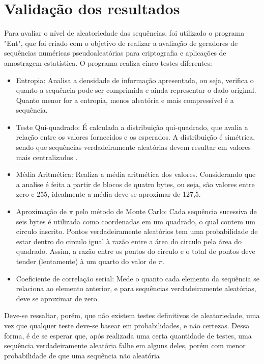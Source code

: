 \section{Validação dos resultados}
Para avaliar o nível de aleatoriedade das sequências, foi utilizado o programa "Ent", que foi criado com o objetivo de realizar a avaliação de geradores de sequências numéricas pseudoaleatórias para criptografia e aplicações de amostragem estatística. O programa realiza cinco testes diferentes:
\begin{itemize}
\item Entropia: Analisa a densidade de informação apresentada, ou seja, verifica o quanto a sequência pode ser comprimida e ainda representar o dado original. Quanto menor for a entropia, menos aleatória e mais compressível é a sequência.
\item Teste Qui-quadrado: É calculada a distribuição qui-quadrado, que avalia a relação entre os valores fornecidos e os esperados. A distribuição é simétrica, sendo que sequências verdadeiramente aleatórias devem resultar em valores mais centralizados \cite{knuth1998art}.
\item Média Aritmética: Realiza a média aritmética dos valores. Considerando que a analise é feita a partir de blocos de quatro bytes, ou seja, são valores entre zero e 255, idealmente a média deve se aproximar de 127,5. 
\item Aproximação de $\pi$ pelo método de Monte Carlo: Cada sequência sucessiva de seis bytes é utilizada como coordenadas em um quadrado, o qual contem um circulo inscrito. Pontos verdadeiramente aleatórios tem uma probabilidade de estar dentro do circulo igual à razão entre a área do circulo pela área do quadrado. Assim, a razão entre os pontos do circulo e o total de pontos deve tender (lentamente) à um quarto do valor de $\pi$.
\item Coeficiente de correlação serial: Mede o quanto cada elemento da sequência se relaciona ao elemento anterior, e para sequências verdadeiramente aleatórias, deve se aproximar de zero.
\end{itemize}
Deve-se ressaltar, porém, que não existem testes definitivos de aleatoriedade, uma vez que qualquer teste deve-se basear em probabilidades, e não certezas. Dessa forma, é de se esperar que, após realizada uma certa quantidade de testes, uma sequência verdadeiramente aleatória falhe em alguns deles, porém com menor probabilidade de que uma sequência não aleatória